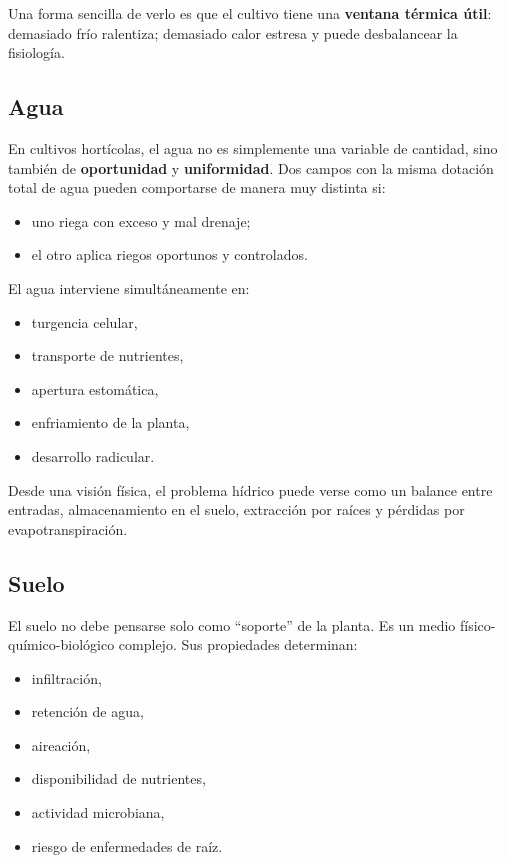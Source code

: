 \documentclass[11pt,a4paper]{article}
\begin{document}
Una forma sencilla de verlo es que el cultivo tiene una \textbf{ventana térmica útil}: demasiado frío ralentiza; demasiado calor estresa y puede desbalancear la fisiología.

\subsection{Agua}

En cultivos hortícolas, el agua no es simplemente una variable de cantidad, sino también de \textbf{oportunidad} y \textbf{uniformidad}. Dos campos con la misma dotación total de agua pueden comportarse de manera muy distinta si:

\begin{itemize}[leftmargin=1.5em]
    \item uno riega con exceso y mal drenaje;
    \item el otro aplica riegos oportunos y controlados.
\end{itemize}

El agua interviene simultáneamente en:
\begin{itemize}[leftmargin=1.5em]
    \item turgencia celular,
    \item transporte de nutrientes,
    \item apertura estomática,
    \item enfriamiento de la planta,
    \item desarrollo radicular.
\end{itemize}

Desde una visión física, el problema hídrico puede verse como un balance entre entradas, almacenamiento en el suelo, extracción por raíces y pérdidas por evapotranspiración.

\subsection{Suelo}

El suelo no debe pensarse solo como \enquote{soporte} de la planta. Es un medio físico-químico-biológico complejo. Sus propiedades determinan:
\begin{itemize}[leftmargin=1.5em]
    \item infiltración,
    \item retención de agua,
    \item aireación,
    \item disponibilidad de nutrientes,
    \item actividad microbiana,
    \item riesgo de enfermedades de raíz.
\end{itemize}
\end{document}
